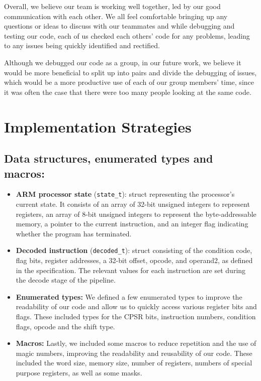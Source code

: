 \documentclass[11pt]{article}
\begin{document}
Overall, we believe our team is working well together, led by our good communication with each other. We all feel comfortable bringing up any questions or ideas to discuss with our teammates and while debugging and testing our code, each of us checked each others' code for any problems, leading to any issues being quickly identified and rectified.

Although we debugged our code as a group, in our future work, we believe it would be more beneficial to split up into pairs and divide the debugging of issues, which would be a more productive use of each of our group members' time, since it was often the case that there were too many people looking at the same code.

\section{Implementation Strategies}

\subsection{Data structures, enumerated types and macros:}

\begin{itemize}

\item \textbf{ARM processor state} (\texttt{state\_t}): struct representing the processor's current state. It consists of an array of 32-bit unsigned integers to represent registers, an array of 8-bit unsigned integers to represent the byte-addressable memory, a pointer to the current instruction, and an integer flag indicating whether the program has terminated.

\item \textbf{Decoded instruction} (\texttt{decoded\_t}): struct consisting of the condition code, flag bits, register addresses, a 32-bit offset, opcode, and operand2, as defined in the specification. The relevant values for each instruction are set during the decode stage of the pipeline.

\item \textbf{Enumerated types:} We defined a few enumerated types to improve the readability of our code and allow us to quickly access various register bits and flags. These included types for the CPSR bits, instruction numbers, condition flags, opcode and the shift type.

\item \textbf{Macros:} Lastly, we included some macros to reduce repetition and the use of magic numbers, improving the readability and reusability of our code. These included the word size, memory size, number of registers, numbers of special purpose registers, as well as some masks.

\end{itemize}
\end{document}
